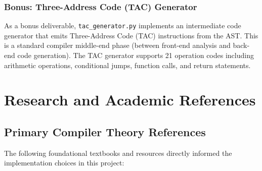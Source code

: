 \documentclass[a4paper,11pt]{article}
\begin{document}
\subsubsection{Bonus: Three-Address Code (TAC) Generator}

As a bonus deliverable, \texttt{tac\_generator.py} implements an intermediate code generator that emits Three-Address Code (TAC) instructions from the AST. This is a standard compiler middle-end phase (between front-end analysis and back-end code generation). The TAC generator supports 21 operation codes including arithmetic operations, conditional jumps, function calls, and return statements.


\section{Research and Academic References}

\subsection{Primary Compiler Theory References}

The following foundational textbooks and resources directly informed the implementation choices in this project:
\end{document}
